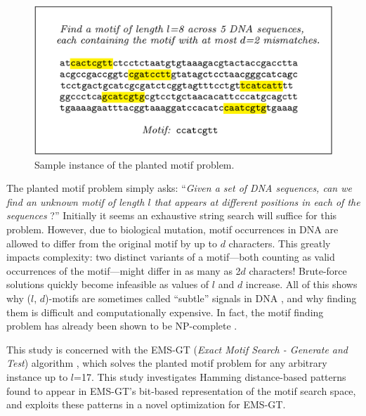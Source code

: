 \documentclass[oneside,12pt]{DISCSthesis}
\begin{document}
		\begin{figure}[h] \label{fig:example}
			\centering
			\includegraphics[width=5.5in]{img/example}
			\caption{Sample instance of the planted motif problem.}
			\end{figure}

		The planted motif problem simply asks: ``\emph{Given a set of DNA sequences, can we find an unknown motif of length $l$ that appears at different positions in each of the sequences} \cite{pevzner2000combinatorial}?'' Initially it seems an exhaustive string search will suffice for this problem. However, due to biological mutation, motif occurrences in DNA are allowed to differ from the original motif by up to $d$ characters. This greatly impacts complexity: two distinct variants of a motif---both counting as valid occurrences of the motif---might differ in as many as 2$d$ characters! Brute-force solutions quickly become infeasible as values of $l$ and $d$ increase. All of this shows why ($l$, $d$)-motifs are sometimes called ``subtle'' signals in DNA  \cite{pevzner2000combinatorial}, and why finding them is difficult and computationally expensive. In fact, the motif finding problem has already been shown to be NP-complete \cite{pms2014}. 



		This study is concerned with the EMS-GT (\emph{Exact Motif Search - Generate and Test}) algorithm \cite{nabos2015dissertation}, which solves the planted motif problem for any arbitrary instance up to $l$=17. This study investigates Hamming distance-based patterns found to appear in EMS-GT's bit-based representation of the motif search space, and exploits these patterns in a novel optimization for EMS-GT.
\end{document}
